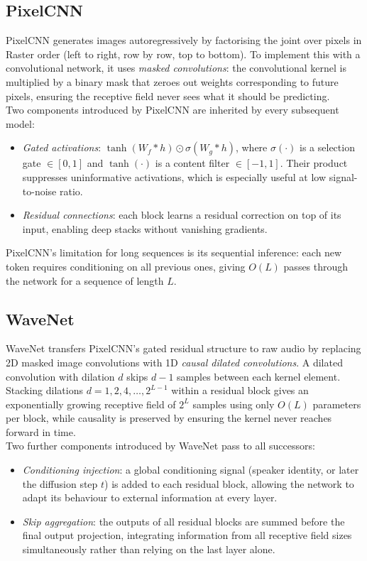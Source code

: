 \subsection{PixelCNN}

PixelCNN \cite{oord2016pixel} generates images autoregressively by factorising
the joint over pixels in Raster order (left to right, row by row, top to bottom). To implement this with a convolutional
network, it uses \textit{masked convolutions}: the convolutional kernel is
multiplied by a binary mask that zeroes out weights corresponding to future
pixels, ensuring the receptive field never sees what it should be predicting.\\

Two components introduced by PixelCNN are inherited by every subsequent model:
\begin{itemize}
    \item \textit{Gated activations}: $\tanh(W_f * h) \odot \sigma(W_g * h)$,
    where $\sigma(\cdot)$ is a selection gate $\in [0,1]$ and $\tanh(\cdot)$
    is a content filter $\in [-1,1]$. Their product suppresses uninformative
    activations, which is especially useful at low signal-to-noise ratio.
    \item \textit{Residual connections}: each block learns a residual correction
    on top of its input, enabling deep stacks without vanishing gradients.
\end{itemize}
PixelCNN's limitation for long sequences is its sequential inference: each new
token requires conditioning on all previous ones, giving $O(L)$ passes through
the network for a sequence of length $L$.

\subsection{WaveNet}

WaveNet \cite{oord2016wavenet} transfers PixelCNN's gated residual structure
to raw audio by replacing 2D masked image convolutions with 1D
\textit{causal dilated convolutions}. A dilated convolution with dilation $d$
skips $d-1$ samples between each kernel element. Stacking dilations
$d = 1, 2, 4, \ldots, 2^{L-1}$ within a residual block gives an exponentially
growing receptive field of $2^L$ samples using only $O(L)$ parameters per
block, while causality is preserved by ensuring the kernel never reaches
forward in time.\\

Two further components introduced by WaveNet pass to all successors:
\begin{itemize}
    \item \textit{Conditioning injection}: a global conditioning signal
    (speaker identity, or later the diffusion step $t$) is added to each
    residual block, allowing the network to adapt its behaviour to external
    information at every layer.
    \item \textit{Skip aggregation}: the outputs of all residual blocks are
    summed before the final output projection, integrating information from
    all receptive field sizes simultaneously rather than relying on the last
    layer alone.
\end{itemize}

